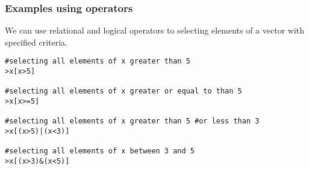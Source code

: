 \documentclass{beamer}
\begin{document}
\begin{frame}[fragile]
\frametitle{Examples using operators}

We can use relational and logical operators to selecting elements
of a vector with specified criteria.

\begin{verbatim}
#selecting all elements of x greater than 5
>x[x>5]

#selecting all elements of x greater or equal to than 5
>x[x>=5]

#selecting all elements of x greater than 5 #or less than 3
>x[(x>5)|(x<3)]

#selecting all elements of x between 3 and 5
>x[(x>3)&(x<5)]
\end{verbatim}

\end{frame}
\end{document}
